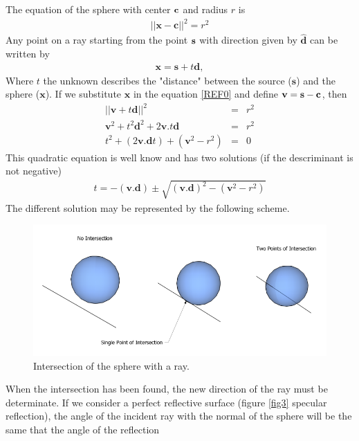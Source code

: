\documentclass[11pt]{amsart}
\begin{document}
The equation of the sphere with center $\bf{c}$ and radius $r$ is 
\begin{eqnarray}
	||\mathbf{x}-\mathbf{c}||^2 = r^2  \label{REF0}
\end{eqnarray}
Any point on a ray  starting from the point $\bf{s}$ with direction given by $\hat{\mathbf{d}}$ can be written by 
\begin{eqnarray}
	\mathbf{x}  =  \mathbf{s} + t\mathbf{d},    \nonumber
\end{eqnarray}
Where $t$ the unknown describes the "distance" between the source ($\mathbf{s}$) and the sphere ($\mathbf{x}$).
If we substitute $\mathbf{x}$ in the equation \ref{REF0} and define $\bf{v} = s-c$, then
\begin{eqnarray}
	||\mathbf{v} + t\mathbf{d}||^2  & = & r^2  \nonumber \\ 
	\mathbf{v}^2 + t^2 \mathbf{d}^2 + 2\mathbf{v}.t\mathbf{d} & = & r^2  \nonumber \\
	t^2  + (2\mathbf{v}.\mathbf{d}t) +(\mathbf{v}^2-r^2) & = & 0 \nonumber
\end{eqnarray}
This quadratic equation is well know and has two solutions (if the descriminant is not negative)
\begin{eqnarray}
	t = - (\mathbf{v}.\mathbf{d})\pm\sqrt{(\mathbf{v}.\mathbf{d})^2-(\mathbf{v}^2 - r^2)}
\end{eqnarray}
The different solution may be represented by the following scheme.
\begin{figure}[htbp]
\begin{center}
\includegraphics[scale=0.5]{Line-Sphere_Intersection_Cropped}
\caption{Intersection of the sphere with a ray. \label{fig2}}
\end{center}
\end{figure}

When the intersection has been found, the new direction of the ray must be determinate. If we consider a perfect reflective surface (figure \ref{fig3} specular reflection), the angle of the incident ray with the normal of the sphere will be the same that the angle of the reflection 
\end{document}
